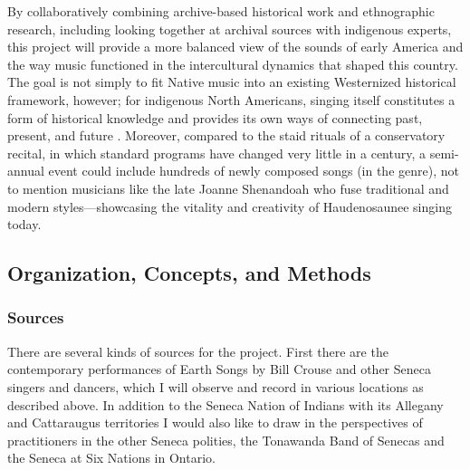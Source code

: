 \documentclass{neh}
\begin{document}
By collaboratively combining archive-based historical work and ethnographic
research, including looking together at archival sources with indigenous
experts, this project will provide a more balanced view of the sounds of early
America and the way music functioned in the intercultural dynamics that
shaped this country.
The goal is not simply to fit Native music into an existing Westernized
historical framework, however; for indigenous North Americans, singing itself
constitutes a form of historical knowledge and provides its own ways of
connecting past, present, and future
\Autocite{Diamond:NativeAmericanHistory}.
Moreover, compared to the staid rituals of a conservatory recital, in which
standard programs have changed very little in a century, a semi-annual
 event could include hundreds of newly composed songs (in the
 genre), not to mention musicians like the late Joanne
Shenandoah who fuse traditional and modern styles---showcasing the vitality
and creativity of Haudenosaunee singing today.

 
\subsection{Organization, Concepts, and Methods}



\subsubsection{Sources}

There are several kinds of sources for the project.
First there are the contemporary performances of Earth Songs by Bill Crouse
and other Seneca singers and dancers, which I will observe and record in
various locations as described above.
In addition to the Seneca Nation of Indians with its Allegany and Cattaraugus
territories I would also like to draw in the perspectives of practitioners in
the other Seneca polities, the Tonawanda Band of Senecas and the Seneca at Six
Nations in Ontario.
\end{document}
